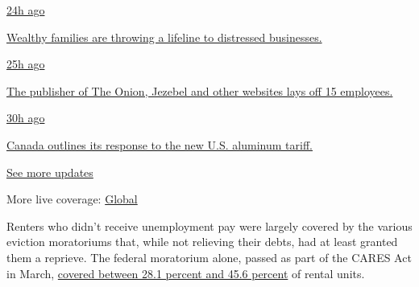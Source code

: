 \href{https://www.nytimes.com/live/2020/08/07/business/stock-market-today-coronavirus?action=click\&pgtype=Article\&state=default\&region=MAIN_CONTENT_1\&context=storylines_live_updates\#wealthy-families-are-throwing-a-lifeline-to-distressed-businesses}{24h
ago}

\href{https://www.nytimes.com/live/2020/08/07/business/stock-market-today-coronavirus?action=click\&pgtype=Article\&state=default\&region=MAIN_CONTENT_1\&context=storylines_live_updates\#wealthy-families-are-throwing-a-lifeline-to-distressed-businesses}{Wealthy
families are throwing a lifeline to distressed businesses.}

\href{https://www.nytimes.com/live/2020/08/07/business/stock-market-today-coronavirus?action=click\&pgtype=Article\&state=default\&region=MAIN_CONTENT_1\&context=storylines_live_updates\#the-publisher-of-the-onion-jezebel-and-other-websites-lays-off-15-employees}{25h
ago}

\href{https://www.nytimes.com/live/2020/08/07/business/stock-market-today-coronavirus?action=click\&pgtype=Article\&state=default\&region=MAIN_CONTENT_1\&context=storylines_live_updates\#the-publisher-of-the-onion-jezebel-and-other-websites-lays-off-15-employees}{The
publisher of The Onion, Jezebel and other websites lays off 15
employees.}

\href{https://www.nytimes.com/live/2020/08/07/business/stock-market-today-coronavirus?action=click\&pgtype=Article\&state=default\&region=MAIN_CONTENT_1\&context=storylines_live_updates\#canada-outlines-its-response-to-the-new-us-aluminum-tariff}{30h
ago}

\href{https://www.nytimes.com/live/2020/08/07/business/stock-market-today-coronavirus?action=click\&pgtype=Article\&state=default\&region=MAIN_CONTENT_1\&context=storylines_live_updates\#canada-outlines-its-response-to-the-new-us-aluminum-tariff}{Canada
outlines its response to the new U.S. aluminum tariff.}

\href{https://www.nytimes.com/live/2020/08/07/business/stock-market-today-coronavirus?action=click\&pgtype=Article\&state=default\&region=MAIN_CONTENT_1\&context=storylines_live_updates}{See
more updates}

More live coverage:
\href{https://www.nytimes.com/2020/08/07/world/covid-19-news.html?action=click\&pgtype=Article\&state=default\&region=MAIN_CONTENT_1\&context=storylines_live_updates}{Global}

Renters who didn't receive unemployment pay were largely covered by the
various eviction moratoriums that, while not relieving their debts, had
at least granted them a reprieve. The federal moratorium alone, passed
as part of the CARES Act in March,
\href{https://www.frbatlanta.org/community-development/publications/partners-update/2020/covid-19-publications/200616-housing-policy-impact-federal-eviction-protection-coverage-and-the-need-for-better-data.aspx}{covered
between 28.1 percent and 45.6 percent} of rental units.

